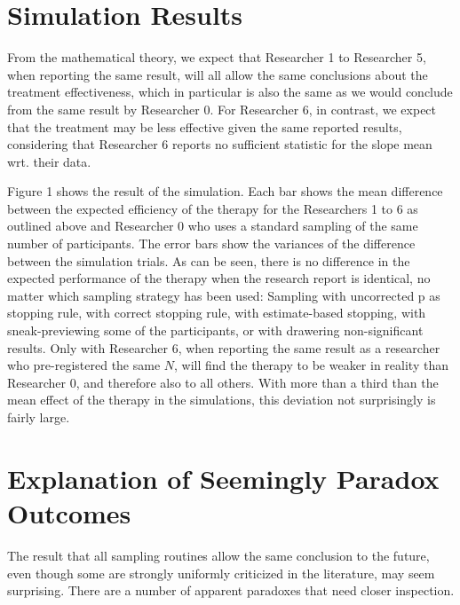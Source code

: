 \documentclass[man]{apa7}\usepackage[]{graphicx}\usepackage[]{xcolor}
\theoremstyle{definition}
\begin{document}
\section{Simulation Results}
From the mathematical theory, we expect that Researcher 1 to Researcher 5, when reporting the same result, will all allow the same conclusions about the treatment effectiveness, which in particular is also the same as we would conclude from the same result by Researcher 0. For Researcher 6, in contrast, we expect that the treatment may be less effective given the same reported results, considering that Researcher 6 reports no sufficient statistic for the slope mean wrt. their data. 

Figure 1 shows the result of the simulation. Each bar shows the mean difference between the expected efficiency of the therapy for the Researchers 1 to 6 as outlined above and Researcher 0 who uses a standard sampling of the same number of participants. The error bars show the variances of the difference between the simulation trials. As can be seen, there is no difference in the expected performance of the therapy when the research report is identical, no matter which sampling strategy has been used: Sampling with uncorrected p as stopping rule, with correct stopping rule, with estimate-based stopping, with sneak-previewing some of the participants, or with drawering non-significant results. Only with Researcher 6, when reporting the same result as a researcher who pre-registered the same $N$, will find the therapy to be weaker in reality than Researcher 0, and therefore also to all others. With more than a third than the mean effect of the therapy in the simulations, this deviation not surprisingly is fairly large. 


\section{Explanation of Seemingly Paradox Outcomes}
The result that all sampling routines allow the same conclusion to the future, even though some are strongly uniformly criticized in the literature, may seem surprising. There are a number of apparent paradoxes that need closer inspection.
\end{document}
